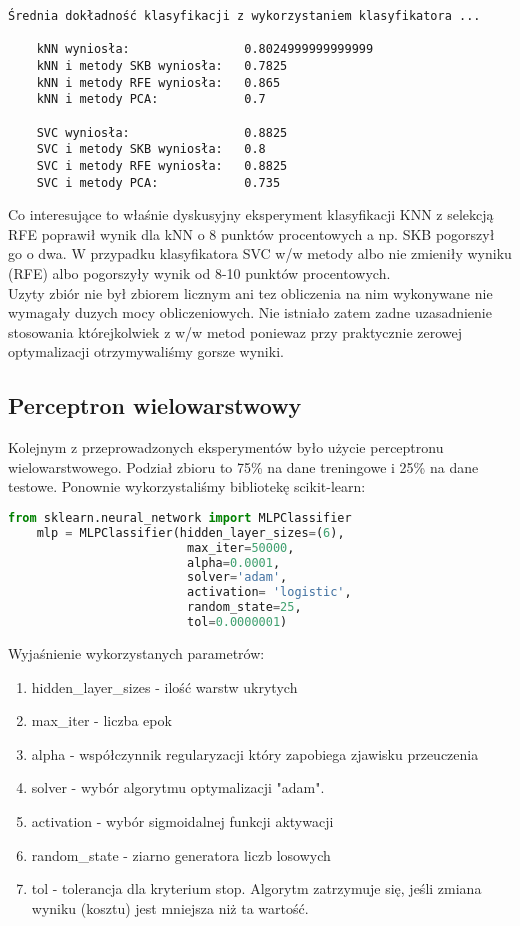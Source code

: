 \begin{verbatim}
Średnia dokładność klasyfikacji z wykorzystaniem klasyfikatora ...

    kNN wyniosła:                0.8024999999999999
    kNN i metody SKB wyniosła:   0.7825
    kNN i metody RFE wyniosła:   0.865
    kNN i metody PCA:            0.7

    SVC wyniosła:                0.8825
    SVC i metody SKB wyniosła:   0.8
    SVC i metody RFE wyniosła:   0.8825
    SVC i metody PCA:            0.735
\end{verbatim}

Co interesujące to właśnie dyskusyjny eksperyment klasyfikacji KNN z selekcją RFE poprawił wynik dla kNN o 8 punktów procentowych a np. SKB pogorszył go o dwa. W przypadku klasyfikatora SVC w/w metody albo nie zmieniły wyniku (RFE) albo pogorszyły wynik od 8-10 punktów procentowych.\\

Uzyty zbiór nie był zbiorem licznym ani tez obliczenia na nim wykonywane nie wymagały duzych mocy obliczeniowych. Nie istniało zatem zadne uzasadnienie stosowania którejkolwiek z w/w metod poniewaz przy praktycznie zerowej optymalizacji otrzymywaliśmy gorsze wyniki.\\

\subsection{Perceptron wielowarstwowy}
Kolejnym z przeprowadzonych eksperymentów było użycie perceptronu wielowarstwowego. Podział zbioru to 75\% na dane treningowe i 25\% na dane testowe. Ponownie wykorzystaliśmy bibliotekę scikit-learn:

\begin{lstlisting}[language=Python, caption=Definicja perceptronu wielowarstwowego]
    from sklearn.neural_network import MLPClassifier
    mlp = MLPClassifier(hidden_layer_sizes=(6),
                         max_iter=50000, 
                         alpha=0.0001,
                         solver='adam',
                         activation= 'logistic', 
                         random_state=25,
                         tol=0.0000001)
\end{lstlisting}

Wyjaśnienie wykorzystanych parametrów:
\begin{enumerate}
    \item hidden\_layer\_sizes - ilość warstw ukrytych
    \item max\_iter - liczba epok
    \item alpha - współczynnik regularyzacji który zapobiega zjawisku przeuczenia
    \item solver - wybór algorytmu optymalizacji "adam".
    \item activation - wybór sigmoidalnej funkcji aktywacji
    \item random\_state - ziarno generatora liczb losowych
    \item tol - tolerancja dla kryterium stop. Algorytm zatrzymuje się, jeśli zmiana wyniku (kosztu) jest mniejsza niż ta wartość.
\end{enumerate}

